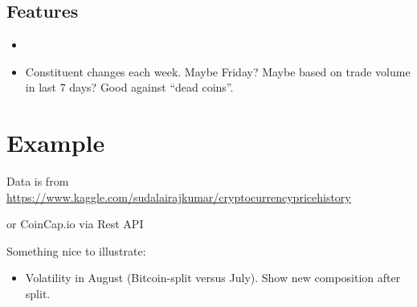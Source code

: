 \documentclass[11pt]{article}
\begin{document}
\subsection{Features}

\begin{itemize}
  \item 
  \item Constituent changes each week. Maybe Friday? Maybe based on trade volume in last 7 days? Good against ``dead coins''.
\end{itemize}


\section{Example}

Data is from \href{https://www.kaggle.com/sudalairajkumar/cryptocurrencypricehistory}{https://www.kaggle.com/sudalairajkumar/cryptocurrencypricehistory}

or CoinCap.io via Rest API

Something nice to illustrate:
\begin{itemize}
  \item Volatility in August (Bitcoin-split versus July). Show new composition after split.
\end{itemize}
\end{document}
